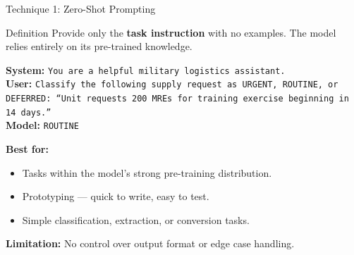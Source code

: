 \documentclass{beamer}
\begin{document}
\begin{frame}{Technique 1: Zero-Shot Prompting}
    \begin{block}{Definition}
        Provide only the \textbf{task instruction} with no examples.
        The model relies entirely on its pre-trained knowledge.
    \end{block}

    \vspace{0.2cm}
    \begin{tcolorbox}[colback=backcolour, colframe=gray!50, title={\small Example}]
        \scriptsize
        \textbf{System:} \texttt{You are a helpful military logistics assistant.}\\[2pt]
        \textbf{User:} \texttt{Classify the following supply request as URGENT, ROUTINE, or DEFERRED:
        ``Unit requests 200 MREs for training exercise beginning in 14 days.''}\\[4pt]
        \textbf{Model:} \texttt{ROUTINE}
    \end{tcolorbox}

    \vspace{0.1cm}
    \textbf{Best for:}
    \begin{itemize}
        \item Tasks within the model's strong pre-training distribution.
        \item Prototyping --- quick to write, easy to test.
        \item Simple classification, extraction, or conversion tasks.
    \end{itemize}

    \textbf{Limitation:} No control over output format or edge case handling.
\end{frame}
\end{document}
